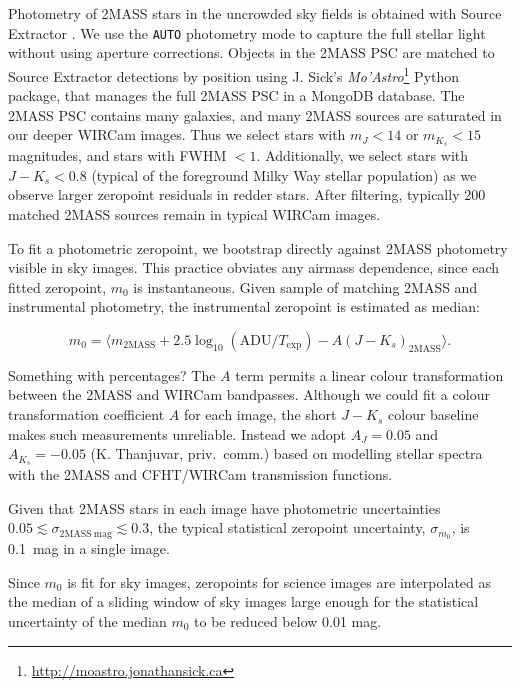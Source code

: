 \documentclass[iop]{emulateapj}
\newcommand{\sw}[1]{\textit{#1}} %
\newcommand{\todo}[1]{\textcolor{BurntOrange}{\textsf{#1}}} %
\begin{document}
Photometry of 2MASS stars in the uncrowded sky fields is obtained with Source Extractor \citep{Bertin:1996}.
We use the \texttt{AUTO} photometry mode to capture the full stellar light without using aperture corrections.
Objects in the 2MASS PSC are matched to Source Extractor detections by position using J. Sick's \sw{Mo'Astro}\footnote{\url{http://moastro.jonathansick.ca}} Python package, that manages the full 2MASS PSC in a MongoDB database.
The 2MASS PSC contains many galaxies, and many 2MASS sources are saturated in our deeper WIRCam images.
Thus we select stars with $m_J < 14$ or $m_{K_s} < 15$ magnitudes, and stars with FWHM $<1$\arcsec.
Additionally, we select stars with $J-K_s < 0.8$ (typical of the foreground Milky Way stellar population) as we observe larger zeropoint residuals in redder stars.
After filtering, typically 200 matched 2MASS sources remain in typical WIRCam images.

To fit a photometric zeropoint, we bootstrap directly against 2MASS photometry visible in sky images.
This practice obviates any airmass dependence, since each fitted zeropoint, $m_0$ is instantaneous.
Given sample of matching 2MASS and instrumental photometry, the instrumental zeropoint is estimated as median:

\begin{equation}
  \label{eq:photcal}
  m_0 = \langle m_\mathrm{2MASS} + 2.5 \log_{10}(\mathrm{ADU}/T_\mathrm{exp}) - A (J-K_s)_\mathrm{2MASS} \rangle.
\end{equation}

\todo{Something with percentages?}
The $A$ term permits a linear colour transformation between the 2MASS and WIRCam bandpasses.
Although we could fit a colour transformation coefficient $A$ for each image, the short $J-K_s$ colour baseline makes such measurements unreliable.
Instead we adopt $A_J = 0.05$ and $A_{K_s} = -0.05$ (K. Thanjuvar, priv.\ comm.) based on modelling stellar spectra with the 2MASS and CFHT/WIRCam transmission functions.

Given that 2MASS stars in each image have photometric uncertainties $0.05 \lesssim \sigma_{\mathrm{2MASS~mag}} \lesssim 0.3$, the typical statistical zeropoint uncertainty, $\sigma_{m_0}$, is 0.1~mag in a single image.

Since $m_0$ is fit for sky images, zeropoints for science images are interpolated as the median of a sliding window of sky images large enough for the statistical uncertainty of the median $m_0$ to be reduced below 0.01 mag.
\end{document}
